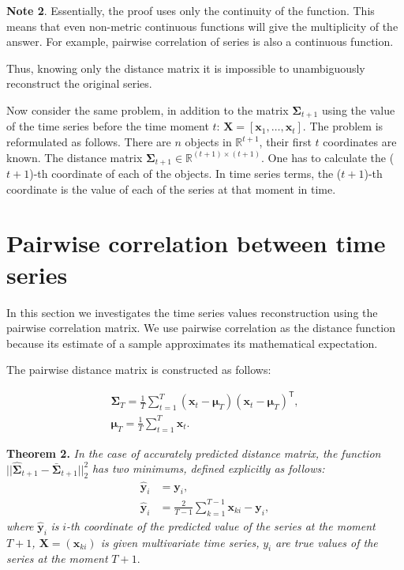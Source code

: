 \documentclass[12pt]{article}
\begin{document}
\textbf{Note 2}. Essentially, the proof uses only the continuity of the function. This means that even non-metric continuous functions will give the multiplicity of the answer. For example, pairwise correlation of series is also a continuous function.

Thus, knowing only the distance matrix it is impossible to unambiguously reconstruct the original series.

Now consider the same problem, in addition to the matrix $\mathbf{\Sigma}_{t+1}$ using the value of the time series before the time moment $t$: $\mathbf{X}=[\mathbf{x}_1, \ldots, \mathbf{x}_{t}]$. The problem is reformulated as follows. There are $n$ objects in $\mathbb{R}^{t+1}$, their first $t$ coordinates are known. The distance matrix $\mathbf{\Sigma}_{t+1} \in \mathbb{R}^{(t+1) \times (t+1)}$. One has to calculate the ($t+1$)-th coordinate of each of the objects. In time series terms, the ($t+1$)-th coordinate is the value of each of the series at that moment in time.

\section{Pairwise correlation between time series}

In this section we investigates the time series values reconstruction using the pairwise correlation matrix. We use pairwise correlation as the distance function because its estimate of a sample approximates its mathematical expectation.

The pairwise distance matrix is constructed as follows:

\begin{subequations}
	\begin{gather*}
		{\mathbf{\Sigma}}_T = \frac{1}{T} \sum_{t=1}^{T} (\mathbf{x}_t - \boldsymbol{\mu}_T)(\mathbf{x}_t - \boldsymbol{\mu}_T)^\mathsf{T},\\
		\boldsymbol{\mu}_T = \frac{1}{T} \sum_{t=1}^{T} \mathbf{x}_t.
		\tag{2} \label{distance_matrix}
	\end{gather*}
\end{subequations}

\textbf{Theorem 2.} \emph{In the case of accurately predicted distance matrix, the function}\\ $||\hat{\mathbf{\Sigma}}_{t+1} - \bar{\mathbf{\Sigma}}_{t+1}||_2^2$ \emph{has two minimums, defined explicitly as follows:}
\begin{align*}
	\hat{\mathbf{y}}_i &= \mathbf{y}_i,\\
	\hat{\mathbf{y}}_i &= \frac{2}{T-1} \sum_{k=1}^{T-1} \mathbf{x}_{ki} - \mathbf{y}_i,
\end{align*}
\emph{where} $\hat{\mathbf{y}}_i$ \emph{is} $i$\emph{-th coordinate of the predicted value of the series at the moment $T+1$, $\mathbf{X}=(\mathbf{x}_{ki})$ is given multivariate time series,} $y_i$ \emph{are true values of the series at the moment} $T+1$.
\end{document}

